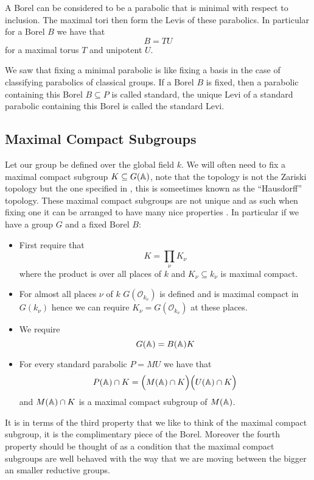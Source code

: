     A Borel can be considered to be a parabolic that is minimal with respect to inclusion. The maximal tori then form the Levis of these parabolics. In particular for a Borel \(B\) we have that 
    \[B = TU\]
    for a maximal torus \(T\) and unipotent \(U\).

    We saw that fixing a minimal parabolic is like fixing a basis in the case of classifying parabolics of classical groups. If a Borel \(B\) is fixed, then a parabolic containing this Borel \(B\subseteq P\) is called standard, the unique Levi of a standard parabolic containing this Borel is called the standard Levi.

    \subsection{Maximal Compact Subgroups}\label{max_compact_subgroup}
    Let our group be defined over the global field \(k\). We will often need to fix a maximal compact subgroup \(K\subseteq G(\A)\), note that the topology is not the Zariski topology but the one specified in \cite{conradWeilGrothendieckApproaches2012}, this is someetimes known as the ``Hausdorff'' topology. These maximal compact subgroups are not unique and as such when fixing one it can be arranged to have many nice properties \cite[I.1.4]{moeglinSpectralDecompositionEisenstein1995}. In particular if we have a group \(G\) and a fixed Borel \(B\):
    \begin{itemize}
        \item First require that 
        \[K = \prod_\nu K_\nu\]
        where the product is over all places of \(k\) and \(K_\nu\subseteq k_\nu\) is maximal compact. 
        \item For almost all places \(\nu\) of \(k\) \(G(\mathcal{O}_{k_\nu})\) is defined and is maximal compact in \(G(k_\nu)\) hence we can require \(K_\nu = G(\mathcal{O}_{k_\nu})\) at these places. 
        \item We require 
        \[G(\A) = B(\A)K\]
        \item For every standard parabolic \(P = MU\) we have that 
        \[P(\A)\cap K = \Bigl( M(\A)\cap K \Bigr) \Bigl( U(\A)\cap K \Bigr)\]
        and \(M(\A)\cap K\) is a maximal compact subgroup of \(M(\A)\).
    \end{itemize}
     It is in terms of the third property that we like to think of the maximal compact subgroup, it is the complimentary piece of the Borel. Moreover the fourth property should be thought of as a condition that the maximal compact subgroups are well behaved with the way that we are moving between the bigger an smaller reductive groups.
    

